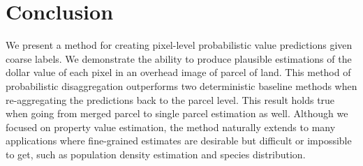\documentclass[10pt,twocolumn,letterpaper]{article}
\begin{document}
\section{Conclusion}

We present a method for creating pixel-level probabilistic value predictions given coarse labels. We demonstrate the ability to produce plausible estimations of the dollar value of each pixel in an overhead image of parcel of land. This method of probabilistic disaggregation outperforms two deterministic baseline methods when re-aggregating the predictions back to the parcel level. This result holds true when going from merged parcel to single parcel estimation as well.
Although we focused on property value estimation, the method naturally extends to many applications where fine-grained estimates are desirable but difficult or impossible to get, such as population density estimation and species distribution.

\newpage

{\small


}
\end{document}
